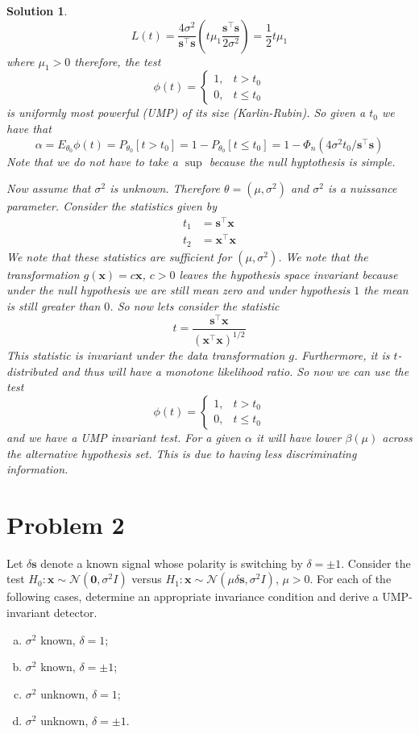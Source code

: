 \documentclass[a4paper]{article}
\newtheorem*{sol}{Solution}
\begin{document}
\begin{sol}
  \[
    L(t) = \frac{4\sigma^2}{\bm{s}^\top\bm{s}}\left(t\mu_1\frac{\bm{s}^\top \bm{s}}{2\sigma^2}\right) = \frac{1}{2} t\mu_1
  \]
  where $\mu_1 > 0$ therefore, the test 
  \[
    \phi(t) 
    = 
    \begin{cases}
      1, & t > t_0 \\
      0, & t \leq t_0
    \end{cases}
  \]
  is uniformly most powerful (UMP) of its size (Karlin-Rubin). So given a $t_0$ we have that
  \[
    \alpha = E_{\theta_0} \phi(t) = P_{\theta_0}[t > t_0] = 1 - P_{\theta_0}[t \leq t_0] = 1 - \Phi_n(4\sigma^2 t_0/\bm{s}^\top\bm{s})
  \]
  Note that we do not have to take a $\sup$ because the null hyptothesis is simple.
  
  Now assume that $\sigma^2$ is unknown. Therefore $\theta = (\mu, \sigma^2)$ and $\sigma^2$ is a nuissance parameter. Consider the statistics given by
  \[
    \begin{aligned}
      t_1 &= \bm{s}^\top \bm{x} \\
      t_2 &= \bm{x}^\top \bm{x}
    \end{aligned}
  \]
  We note that these statistics are sufficient for $(\mu, \sigma^2)$. We note that the transformation $g(\bm{x}) = c\bm{x}$, $c > 0$ leaves the hypothesis space invariant because under the null hypothesis we are still mean zero and under hypothesis $1$ the mean is still greater than $0$. So now lets consider the statistic 
  \[
    t = \frac{\bm{s}^\top \bm{x}}{(\bm{x}^\top \bm{x})^{1/2}}
  \]
  This statistic is invariant under the data transformation $g$. Furthermore, it is $t$-distributed and thus will have a monotone likelihood ratio.  So now we can use the test
  \[
    \phi(t) 
    = 
    \begin{cases}
      1, & t > t_0 \\
      0, & t \leq t_0
    \end{cases}
  \]
  and we have a UMP invariant test. For a given $\alpha$ it will have lower $\beta(\mu)$ across the alternative hypothesis set. This is due to having less discriminating information.
\end{sol}

\section*{Problem 2}%
Let $\delta \bm{s}$ denote a known signal whose polarity is switching by $\delta = \pm 1$. Consider the test $H_0: \bm{x} \sim \mathcal{N}(\bm{0}, \sigma^2 I)$ versus $H_1: \bm{x} \sim \mathcal{N}(\mu\delta \bm{s}, \sigma^2 I)$, $\mu > 0$. For each of the following cases, determine an appropriate invariance condition and derive a UMP-invariant detector.
\begin{enumerate}[a.]
  \item $\sigma^2$ known, $\delta = 1$;
  \item $\sigma^2$ known, $\delta = \pm 1$;
  \item $\sigma^2$ unknown, $\delta = 1$;
  \item $\sigma^2$ unknown, $\delta = \pm 1$.
\end{enumerate}
\end{document}
